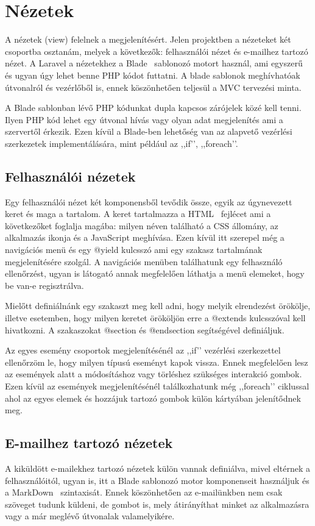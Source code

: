 \documentclass[
]{thesis-ekf}
\theoremstyle{definition}
\theoremstyle{remark}
\begin{document}
	\section{Nézetek}
	A nézetek (view) felelnek a megjelenítésért. Jelen projektben a nézeteket két csoportba osztanám, melyek a következők: felhasználói nézet és e-mailhez tartozó nézet. A Laravel a nézetekhez a Blade~\cite{laravel_blade} sablonozó motort használ, ami egyszerű és ugyan úgy lehet benne PHP kódot futtatni. A blade sablonok meghívhatóak útvonalról és vezérlőből is, ennek köszönhetően teljesül a MVC tervezési minta. 
	
	A Blade sablonban lévő PHP kódunkat dupla kapcsos zárójelek közé kell tenni. Ilyen PHP kód lehet egy útvonal hívás vagy olyan adat megjelenítés ami a szervertől érkezik. Ezen kívül a Blade-ben lehetőség van az alapvető vezérlési szerkezetek implementálására, mint például az ,,if’’, ,,foreach’’.
	
	\subsection{Felhasználói nézetek}
	Egy felhasználói nézet két komponensből tevődik össze, egyik az úgynevezett keret és maga a tartalom. A keret tartalmazza a HTML~\cite{html_doc} fejlécet ami a következőket foglalja magába: milyen néven található a CSS állomány, az alkalmazás ikonja és a JavaScript meghívása. Ezen kívül itt szerepel még a navigációs menü és egy @yield kulcsszó ami egy szakasz tartalmának megjelenítésére szolgál. A navigációs menüben találhatunk egy felhasználó ellenőrzést, ugyan is látogató annak megfelelően láthatja a menü elemeket, hogy be van-e regisztrálva.
	
	Mielőtt definiálnánk egy szakaszt meg kell adni, hogy melyik elrendezést örökölje, illetve esetemben, hogy milyen keretet örököljön erre a @extends kulcsszóval kell hivatkozni. A szakaszokat @section és @endsection segítségével definiáljuk.
	
	Az egyes esemény csoportok megjelenítésénél az ,,if’’ vezérlési szerkezettel ellenőrzöm le, hogy milyen típusú eseményt kapok vissza. Ennek megfelelően lesz az események alatt a módosításhoz vagy törléshez szükséges interakció gombok. Ezen kívül az események megjelenítésénél találkozhatunk még ,,foreach’’ ciklussal ahol az egyes elemek és hozzájuk tartozó gombok külön kártyában jelenítődnek meg. 
	
	\subsection{E-mailhez tartozó nézetek}
	A kiküldött e-mailekhez tartozó nézetek külön vannak definiálva, mivel eltérnek a felhasználóitól, ugyan is, itt a Blade sablonozó motor komponenseit használjuk és a MarkDown~\cite{markdown_page} szintaxisát. Ennek köszönhetően az e-mailünkben nem csak szöveget tudunk küldeni, de gombot is, mely átirányíthat minket az alkalmazásra vagy a már meglévő útvonalak valamelyikére.
	
\end{document}
